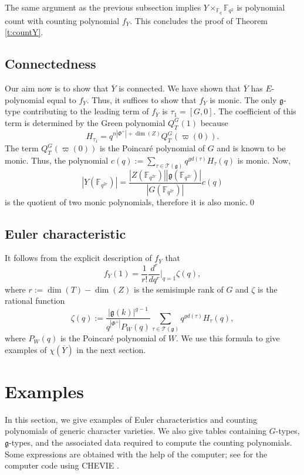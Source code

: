 \documentclass[12pt]{amsart}
\theoremstyle{plain}
\theoremstyle{definition}
\theoremstyle{remark}
\newcommand{\Fq}{\mathbb{F}_q}
\newcommand{\fg}{\mathfrak{g}}
\begin{document}
\subsubsection{} The same argument as the previous subsection implies $Y\times_{\Fq} \mathbb{F}_{q^2}$  is polynomial count with counting polynomial $f_Y$. 
This concludes the proof of Theorem \ref{t:countY}.


\subsection{Connectedness} 
Our aim now is to show that $\overline{Y}$ is connected. We have shown that $\overline{Y}$ has $E$-polynomial equal to $f_Y$. Thus, it suffices to show that $f_Y$ is monic. The only $\fg$-type contributing to the leading term of $f_Y$ is $\tau_1=[G, 0]$. The coefficient of this term is determined by the Green polynomial $Q_T^G(1)$ because
\[
H_{\tau_1}=q^{n|\Phi^+|+\dim(Z)}Q_T^G(\varpi(0)).
\] The term $Q_T^G(\varpi(0))$ is the Poincar\'e polynomial of $G$ and is known to be monic. Thus, the polynomial $c(q):=\sum_{\tau \in \mathcal{T}(\fg)} q^{gd(\tau)}H_\tau(q)$ is monic. Now, 
\[
|Y(\mathbb{F}_{q^{2r}})|=\frac{|Z(\mathbb{F}_{q^{2r}} )| |\fg(\mathbb{F}_{q^{2r}})| }{|G(\mathbb{F}_{q^{2r}})|}c(q )
\] is the quotient of two monic polynomials, therefore it is also  monic.\qed

\subsection{Euler characteristic} \label{s:EulerY}
It follows from the explicit description of $f_Y$ that 
\[
f_Y(1) = \frac{1}{r!} \frac{d^{r}}{dq^{r}} \bigg|_{q=1} \zeta(q),
\]
where $r:=\dim(T)-\dim(Z)$ is the semisimple rank of $G$ and $\zeta$ is the rational function
\[
\zeta(q) := \frac{|\mathfrak{g}(k)|^{g-1}}{q^{|\Phi^+|}P_W(q)} \sum_{\tau\in\mathcal{T}(\mathfrak{g})} q^{g d(\tau)} H_\tau(q),
\]
where $P_W(q)$ is the Poincar\'e polynomial of $W$.
We use this formula to give examples of $\chi(\overline{Y})$ in the next section. 

\newpage 

\section{Examples}\label{s:Examples} 
In this section, we give examples of Euler characteristics and counting polynomials of generic character varieties. We also give tables containing $G$-types, $\fg$-types, and the associated data required to compute the counting polynomials. Some expressions are obtained with the help of the computer; see \cite{Bailey} for the computer code using CHEVIE \cite{GHLMP96,Michel15}.
 
\end{document}
